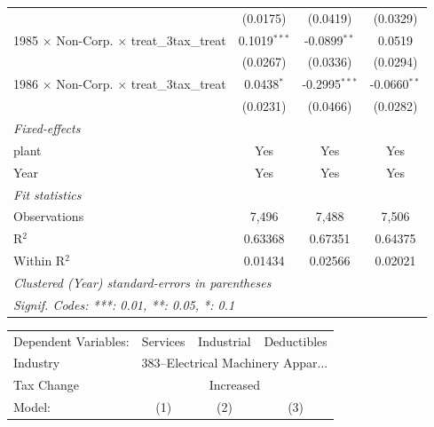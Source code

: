 \documentclass[
  12pt]{article}
\theoremstyle{definition}
\theoremstyle{remark}
\begin{document}
\begin{table}
\begin{minipage}{\linewidth}
\begin{tabular}{lccc}
                                                           & (0.0175)       & (0.0419)        & (0.0329)\\   
   1985 $\times$ Non-Corp. $\times$ treat\_3tax\_treat     & 0.1019$^{***}$ & -0.0899$^{**}$  & 0.0519\\   
                                                           & (0.0267)       & (0.0336)        & (0.0294)\\   
   1986 $\times$ Non-Corp. $\times$ treat\_3tax\_treat     & 0.0438$^{*}$   & -0.2995$^{***}$ & -0.0660$^{**}$\\   
                                                           & (0.0231)       & (0.0466)        & (0.0282)\\   
   \midrule
   \emph{Fixed-effects}\\
   plant                                                   & Yes            & Yes             & Yes\\  
   Year                                                    & Yes            & Yes             & Yes\\  
   \midrule
   \emph{Fit statistics}\\
   Observations                                            & 7,496          & 7,488           & 7,506\\  
   R$^2$                                                   & 0.63368        & 0.67351         & 0.64375\\  
   Within R$^2$                                            & 0.01434        & 0.02566         & 0.02021\\  
   \midrule \midrule
   \multicolumn{4}{l}{\emph{Clustered (Year) standard-errors in parentheses}}\\
   \multicolumn{4}{l}{\emph{Signif. Codes: ***: 0.01, **: 0.05, *: 0.1}}\\
\end{tabular}
\par\endgroup
\begingroup
\centering
\begin{tabular}{lccc}
   \tabularnewline \midrule \midrule
   Dependent Variables:                                    & Services       & Industrial      & Deductibles\\  
   Industry & \multicolumn{3}{c}{383–Electrical Machinery Appar...} \\ 
   Tax Change & \multicolumn{3}{c}{Increased} \\ 
   Model:                                                  & (1)            & (2)             & (3)\\  

\end{tabular}
\end{minipage}
\end{table}
\end{document}
